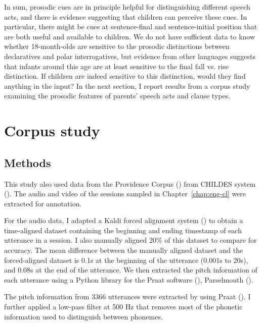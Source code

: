 In sum, prosodic cues are in principle helpful for distinguishing different speech acts, and there is evidence suggesting that children can perceive these cues. In particular, there might be cues at sentence-final and sentence-initial position that are both useful and available to children. We do not have sufficient data to know whether 18-month-olds are sensitive to the prosodic distinctions between declaratives and polar interrogatives, but evidence from other languages suggests that infants around this age are at least sensitive to the final fall vs. rise distinction. If children are indeed sensitive to this distinction, would they find anything in the input? In the next section, I report results from a corpus study examining the prosodic features of parents' speech acts and clause types.

\section{Corpus study}
\label{sec:prosody:corpus}


\subsection{Methods}
\label{sec:engsp:corpus:method}
This study also used data from the Providence Corpus (\citealt{ProvidenceCorpus}) from CHILDES system (\citealt{CHILDES}). The audio and video of the sessions sampled in Chapter~\ref{chap:eng-cl} were extracted for annotation. 

For the audio data, I adapted a Kaldi forced alignment system (\cite{kaldi}) to obtain a time-aligned dataset containing the beginning and ending timestamp of each utterance in a session. I also manually aligned 20\% of this dataset to compare for accuracy. The mean difference between the manually aligned dataset and the forced-aligned dataset is 0.1s at the beginning of the utterance (0.001s to 20s), and 0.08s at the end of the utterance. We then extracted the pitch information of each utterance using a Python library for the Praat software (\cite{praat}), Parselmouth (\cite{parselmouth}). 


The pitch information from 3366 utterances were extracted by using Praat (\citealt{praat}). I further applied a low-pass filter at 500 Hz that removes most of the phonetic information used to distinguish between phonemes. 

